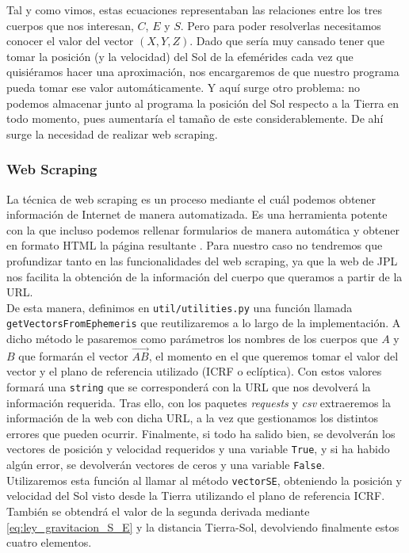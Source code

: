 Tal y como vimos, estas ecuaciones representaban las relaciones entre los tres cuerpos que nos interesan, $C$, $E$ y $S$. Pero para poder resolverlas necesitamos conocer el valor del vector $(X,Y,Z)$. Dado que sería muy cansado tener que tomar la posición (y la velocidad) del Sol de la efemérides cada vez que quisiéramos hacer una aproximación, nos encargaremos de que nuestro programa pueda tomar ese valor automáticamente. Y aquí surge otro problema: no podemos almacenar junto al programa la posición del Sol respecto a la Tierra en todo momento, pues aumentaría el tamaño de este considerablemente. De ahí surge la necesidad de realizar web scraping.\\

\subsubsection{Web Scraping}
La técnica de web scraping es un proceso mediante el cuál podemos obtener información de Internet de manera automatizada. Es una herramienta potente con la que incluso podemos rellenar formularios de manera automática y obtener en formato HTML la página resultante \cite{webscraping}. Para nuestro caso no tendremos que profundizar tanto en las funcionalidades del web scraping, ya que la web de JPL \cite{jpl} nos facilita la obtención de la información del cuerpo que queramos a partir de la URL.\\

De esta manera, definimos en \texttt{util/utilities.py} una función llamada \texttt{getVectorsFromEphemeris} que reutilizaremos a lo largo de la implementación. A dicho método le pasaremos como parámetros los nombres de los cuerpos que $A$ y $B$ que formarán el vector $\overrightarrow{AB}$, el momento en el que queremos tomar el valor del vector y el plano de referencia utilizado (ICRF o eclíptica). Con estos valores formará una \texttt{string} que se corresponderá con la URL que nos devolverá la información requerida. Tras ello, con los paquetes \textit{requests} y \textit{csv} extraeremos la información de la web con dicha URL, a la vez que gestionamos los distintos errores que pueden ocurrir. Finalmente, si todo ha salido bien, se devolverán los vectores de posición y velocidad requeridos y una variable \texttt{True}, y si ha habido algún error, se devolverán vectores de ceros y una variable \texttt{False}.\\

Utilizaremos esta función al llamar al método \texttt{vectorSE}, obteniendo la posición y velocidad del Sol visto desde la Tierra utilizando el plano de referencia ICRF. También se obtendrá el valor de la segunda derivada mediante \eqref{eq:ley_gravitacion_S_E} y la distancia Tierra-Sol, devolviendo finalmente estos cuatro elementos.\\

